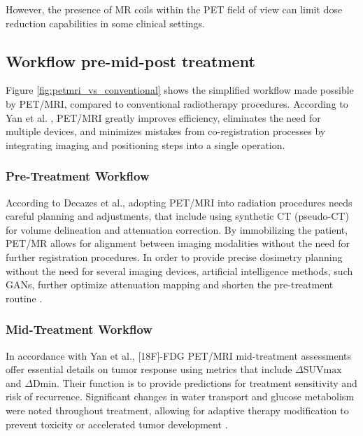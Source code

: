 \documentclass[11pt]{article} %
\begin{document}
\begin{multicols}{2}
However, the presence of MR coils within the PET field of view can limit dose reduction capabilities in some clinical settings.

\subsection{Workflow pre-mid-post treatment}
Figure \ref{fig:petmri_vs_conventional} shows the simplified workflow made possible by PET/MRI, compared to conventional radiotherapy procedures. According to Yan et al. \cite{yan2024}, PET/MRI greatly improves efficiency, eliminates the need for multiple devices, and minimizes mistakes from co-registration processes by integrating imaging and positioning steps into a single operation.


\subsubsection{Pre-Treatment Workflow}

According to Decazes et al., adopting PET/MRI into radiation procedures needs careful planning and adjustments, that include using synthetic CT (pseudo-CT) for volume delineation and attenuation correction. %
 By immobilizing the patient, PET/MR allows for alignment between imaging modalities without the need for further registration procedures. In order to provide precise dosimetry planning without the need for several imaging devices, artificial intelligence methods, such GANs, further optimize attenuation mapping and shorten the pre-treatment routine \cite{decazes2021}.


\subsubsection{Mid-Treatment Workflow}

In accordance with Yan et al., [18F]-FDG PET/MRI mid-treatment assessments %
offer essential details on tumor response using metrics that include $\Delta \text{SUVmax}$ and $\Delta \text{Dmin}$. Their function is to provide predictions for treatment sensitivity and risk of recurrence. Significant changes in water transport and glucose metabolism were noted throughout treatment, allowing for adaptive therapy modification to prevent toxicity or accelerated tumor development \cite{yan2024}.

\end{multicols}
\end{document}
